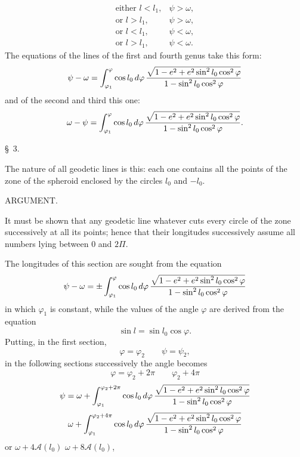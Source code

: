 \begingroup\small
\[
\begin{array}{ll}
\text{either } l<l_1, & \psi>\omega,\\
\text{or } l>l_1, & \psi>\omega,\\
\text{or } l<l_1, & \psi<\omega,\\
\text{or } l>l_1, & \psi<\omega.
\end{array}
\]
The equations of the lines of the first and fourth genus take this form:
\[
 \psi-\omega=\int_{\varphi_1}^{\varphi}\cos l_0\,d\varphi\,{\sqrt{1-e^2+e^2\sin^2l_0\cos^2\varphi}\over 1-\sin^2l_0\cos^2\varphi}
\]
and of the second and third this one:
\[
 \omega-\psi=\int_{\varphi_1}^{\varphi}\cos l_0\,d\varphi\,{\sqrt{1-e^2+e^2\sin^2l_0\cos^2\varphi}\over 1-\sin^2l_0\cos^2\varphi}.
\]

\begin{center}\S\ 3.\end{center}

The nature of all geodetic lines is this: each one contains all the points of the zone of the spheroid enclosed by the circles $l_0$ and $-l_0$.

\begin{center}ARGUMENT.\end{center}

It must be shown that any geodetic line whatever cuts every circle of the zone successively at all its points; hence that their longitudes successively assume all numbers lying between $0$ and $2\Pi$.

The longitudes of this section are sought from the equation
\[
 \psi-\omega=\pm\int_{\varphi_1}^{\varphi}\cos l_0\,d\varphi\,{\sqrt{1-e^2+e^2\sin^2l_0\cos^2\varphi}\over 1-\sin^2l_0\cos^2\varphi}
\]
in which $\varphi_1$ is constant, while the values of the angle $\varphi$ are derived from the equation
\[
 \sin l=\sin l_0\cos\varphi.
\]
Putting, in the first section,
\[
 \varphi=\varphi_2\qquad \psi=\psi_2,
\]
in the following sections successively the angle becomes
\[
 \varphi=\varphi_2+2\pi\qquad \varphi_2+4\pi
\]
\[
 \psi=\omega+\int_{\varphi_1}^{\varphi_2+2\pi}\cos l_0\,d\varphi\,{\sqrt{1-e^2+e^2\sin^2l_0\cos^2\varphi}\over 1-\sin^2l_0\cos^2\varphi}
\]
\[
 \omega+\int_{\varphi_1}^{\varphi_2+4\pi}\cos l_0\,d\varphi\,{\sqrt{1-e^2+e^2\sin^2l_0\cos^2\varphi}\over 1-\sin^2l_0\cos^2\varphi}
\]
or $\omega+4\mathcal A(l_0)$ \qquad $\omega+8\mathcal A(l_0)$,
\endgroup
